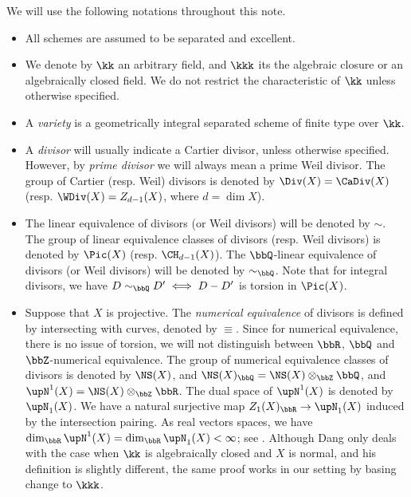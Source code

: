   \begin{notation}
    We will use the following notations throughout this note.
    \begin{itemize}
      \item All schemes are assumed to be separated and excellent.
      \item We denote by $\kk$ an arbitrary field, and $\kkk$ its the algebraic closure or an algebraically closed field.
        We do not restrict the characteristic of $\kk$ unless otherwise specified.
      \item A \emph{variety} is a geometrically integral separated scheme of finite type over $\kk$.
      \item A \emph{divisor} will usually indicate a Cartier divisor, unless otherwise specified.
        However, by \emph{prime divisor} we will always mean a prime Weil divisor.
        The group of Cartier (resp. Weil) divisors is denoted by $\Div(X) = \CaDiv(X)$ (resp. $\WDiv(X) = Z_{d-1}(X)$, where $d = \dim X$).
      \item The linear equivalence of divisors (or Weil divisors) will be denoted by $\sim$.
        The group of linear equivalence classes of divisors (resp. Weil divisors) is denoted by $\Pic(X)$ (resp. $\CH_{d-1}(X)$).
        The $\bbQ$-linear equivalence of divisors (or Weil divisors) will be denoted by $\sim_\bbQ$.
        Note that for integral divisors, we have $D \sim_\bbQ D' \iff D - D'$ is torsion in $\Pic(X)$.
       
      \item Suppose that $X$ is projective.
        The \emph{numerical equivalence} of divisors is defined by intersecting with curves, denoted by $\equiv$.
        Since for numerical equivalence, there is no issue of torsion, we will not distinguish between $\bbR$, $\bbQ$ and $\bbZ$-numerical equivalence.
        The group of numerical equivalence classes of divisors is denoted by $\NS(X)$, and $\NS(X)_\bbQ = \NS(X) \otimes_\bbZ \bbQ$, and $\upN^1(X) = \NS(X) \otimes_\bbZ \bbR$.
        The dual space of $\upN^1(X)$ is denoted by $\upN_1(X)$.
        We have a natural surjective map $Z_1(X)_\bbR \to \upN_1(X)$ induced by the intersection pairing.
        As real vectors spaces, we have $\dim_\bbR \upN^1(X) = \dim_\bbR \upN_1(X) < \infty$; see \cite[Theorem 2.5.1]{Dang20degrees}.
        Although Dang only deals with the case when $\kk$ is algebraically closed and $X$ is normal, and his definition is slightly different, the same proof works in our setting by basing change to $\kkk$.
    \end{itemize}
    
    \Yang{}
  \end{notation}

